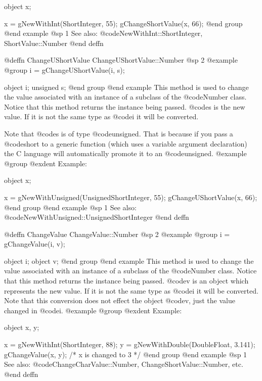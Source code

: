 object  x;

x = gNewWithInt(ShortInteger, 55);
gChangeShortValue(x, 66);
@end group
@end example
@sp 1
See also:  @code{NewWithInt::ShortInteger, ShortValue::Number}
@end deffn









@deffn {ChangeUShortValue} ChangeUShortValue::Number
@sp 2
@example
@group
i = gChangeUShortValue(i, s);

object  i;
unsigned  s;
@end group
@end example
This method is used to change the value associated with an instance of
a subclass of the @code{Number} class.  Notice that this method
returns the instance being passed.  @code{s} is the new value.
If it is not the same type as @code{i} it will be converted.

Note that @code{s} is of type @code{unsigned}.  That is because if you pass a
@code{short} to a generic function (which uses a variable argument
declaration) the C language will automatically promote it to an
@code{unsigned}.
@example
@group
@exdent Example:

object  x;

x = gNewWithUnsigned(UnsignedShortInteger, 55);
gChangeUShortValue(x, 66);
@end group
@end example
@sp 1
See also:  @code{NewWithUnsigned::UnsignedShortInteger}
@end deffn










@deffn {ChangeValue} ChangeValue::Number
@sp 2
@example
@group
i = gChangeValue(i, v);

object  i;
object  v;
@end group
@end example
This method is used to change the value associated with an instance of a
subclass of the @code{Number} class.  Notice that this method returns
the instance being passed.  @code{v} is an object which represents the
new value.  If it is not the same type as @code{i} it will be converted.
Note that this conversion does not effect the object @code{v}, just
the value changed in @code{i}.
@example
@group
@exdent Example:

object  x, y;

x = gNewWithInt(ShortInteger, 88);
y = gNewWithDouble(DoubleFloat, 3.141);
gChangeValue(x, y);    /*  x is changed to 3  */
@end group
@end example
@sp 1
See also:  @code{ChangeCharValue::Number, ChangeShortValue::Number, etc.}
@end deffn










